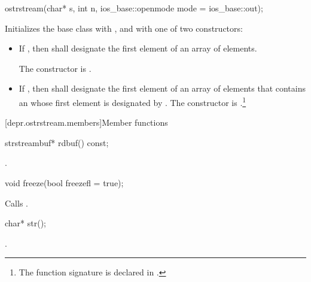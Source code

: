 %
\begin{itemdecl}
ostrstream(char* s, int n, ios_base::openmode mode = ios_base::out);
\end{itemdecl}

\begin{itemdescr}
\pnum
\effects
Initializes the base class with ,
and  with one of two constructors:

\begin{itemize}
\item
If
,
then  shall designate the first element of an array of  elements.

The constructor is
.
\item
If
,
then  shall designate the first element of an array of  elements that
contains an \ntbs{} whose first element is designated by .
%
The constructor is
.\footnote{The function signature
%
is declared in .}
\end{itemize}
\end{itemdescr}

[depr.ostrstream.members]{Member functions}

%
\begin{itemdecl}
strstreambuf* rdbuf() const;
\end{itemdecl}

\begin{itemdescr}
\pnum
\returns
{}.
\end{itemdescr}

%
\begin{itemdecl}
void freeze(bool freezefl = true);
\end{itemdecl}

\begin{itemdescr}
\pnum
\effects
Calls
.
\end{itemdescr}

%
\begin{itemdecl}
char* str();
\end{itemdecl}

\begin{itemdescr}
\pnum
\returns
{}.
\end{itemdescr}

